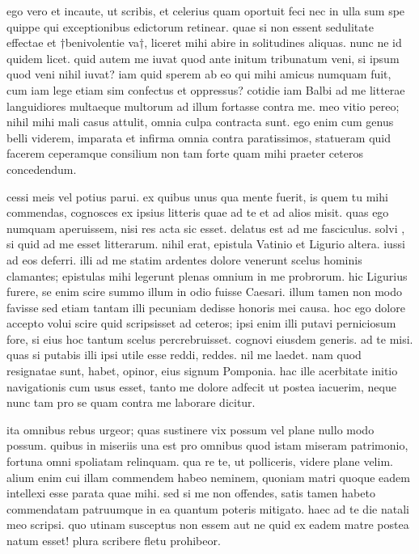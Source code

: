 


 ego vero et incaute, ut scribis, et celerius quam oportuit feci nec in ulla sum spe quippe qui exceptionibus edictorum retinear. quae si non essent sedulitate effectae et †benivolentie va†, liceret mihi abire in solitudines aliquas. nunc ne id quidem licet. quid autem me iuvat quod ante initum tribunatum veni, si ipsum quod veni nihil iuvat? iam quid sperem ab eo qui mihi amicus numquam fuit, cum iam lege etiam sim confectus et oppressus? cotidie iam Balbi ad me litterae languidiores multaeque multorum ad illum fortasse contra me. meo vitio pereo; nihil mihi mali casus attulit, omnia culpa contracta sunt. ego enim cum genus belli viderem, imparata et infirma omnia contra paratissimos, statueram quid facerem ceperamque consilium non tam forte quam mihi praeter ceteros concedendum.

 cessi meis vel potius parui. ex quibus unus qua mente fuerit, is quem tu mihi commendas, cognosces ex ipsius litteris quae ad te et ad alios misit. quas ego numquam aperuissem, nisi res acta sic esset. delatus est ad me fasciculus. solvi , si quid ad me esset litterarum. nihil erat, epistula Vatinio et Ligurio altera. iussi ad eos deferri. illi ad me statim ardentes dolore venerunt scelus hominis clamantes; epistulas mihi legerunt plenas omnium in me probrorum. hic Ligurius furere, se enim scire summo illum in odio fuisse Caesari. illum tamen non modo favisse sed etiam tantam illi pecuniam dedisse honoris mei causa. hoc ego dolore accepto volui scire quid scripsisset ad ceteros; ipsi enim illi putavi perniciosum fore, si eius hoc tantum scelus percrebruisset. cognovi eiusdem generis. ad te misi. quas si putabis illi ipsi utile esse reddi, reddes. nil me laedet. nam quod resignatae sunt, habet, opinor, eius signum Pomponia. hac ille acerbitate initio navigationis cum usus esset, tanto me dolore adfecit ut postea iacuerim, neque nunc tam pro se quam contra me laborare dicitur.

 ita omnibus rebus urgeor; quas sustinere vix possum vel plane nullo modo possum. quibus in miseriis una est pro omnibus quod istam miseram patrimonio, fortuna omni spoliatam relinquam. qua re te, ut polliceris, videre plane velim. alium enim cui illam commendem habeo neminem, quoniam matri quoque eadem intellexi esse parata quae mihi. sed si me non offendes, satis tamen habeto commendatam patruumque in ea quantum poteris mitigato. haec ad te die natali meo scripsi. quo utinam susceptus non essem aut ne quid ex eadem matre postea natum esset! plura scribere fletu prohibeor.
